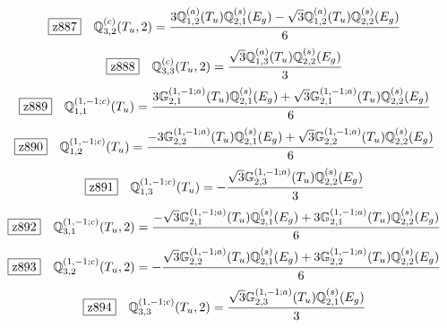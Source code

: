 \documentclass[fleqn,10pt,landscape]{jsarticle}
\begin{document}
\begin{dmath*}
\hspace*{3mm}\fbox{z887}\quad \mathbb{Q}_{3,2}^{(c)}(T_{u},2)=\frac{3 \mathbb{Q}_{1,2}^{(a)}(T_{u}) \mathbb{Q}_{2,1}^{(s)}(E_{g}) - \sqrt{3} \mathbb{Q}_{1,2}^{(a)}(T_{u}) \mathbb{Q}_{2,2}^{(s)}(E_{g})}{6}
\end{dmath*}
\begin{dmath*}
\hspace*{3mm}\fbox{z888}\quad \mathbb{Q}_{3,3}^{(c)}(T_{u},2)=\frac{\sqrt{3} \mathbb{Q}_{1,3}^{(a)}(T_{u}) \mathbb{Q}_{2,2}^{(s)}(E_{g})}{3}
\end{dmath*}
\begin{dmath*}
\hspace*{3mm}\fbox{z889}\quad \mathbb{Q}_{1,1}^{(1,-1;c)}(T_{u})=\frac{3 \mathbb{G}_{2,1}^{(1,-1;a)}(T_{u}) \mathbb{Q}_{2,1}^{(s)}(E_{g}) + \sqrt{3} \mathbb{G}_{2,1}^{(1,-1;a)}(T_{u}) \mathbb{Q}_{2,2}^{(s)}(E_{g})}{6}
\end{dmath*}
\begin{dmath*}
\hspace*{3mm}\fbox{z890}\quad \mathbb{Q}_{1,2}^{(1,-1;c)}(T_{u})=\frac{- 3 \mathbb{G}_{2,2}^{(1,-1;a)}(T_{u}) \mathbb{Q}_{2,1}^{(s)}(E_{g}) + \sqrt{3} \mathbb{G}_{2,2}^{(1,-1;a)}(T_{u}) \mathbb{Q}_{2,2}^{(s)}(E_{g})}{6}
\end{dmath*}
\begin{dmath*}
\hspace*{3mm}\fbox{z891}\quad \mathbb{Q}_{1,3}^{(1,-1;c)}(T_{u})=- \frac{\sqrt{3} \mathbb{G}_{2,3}^{(1,-1;a)}(T_{u}) \mathbb{Q}_{2,2}^{(s)}(E_{g})}{3}
\end{dmath*}
\begin{dmath*}
\hspace*{3mm}\fbox{z892}\quad \mathbb{Q}_{3,1}^{(1,-1;c)}(T_{u},2)=\frac{- \sqrt{3} \mathbb{G}_{2,1}^{(1,-1;a)}(T_{u}) \mathbb{Q}_{2,1}^{(s)}(E_{g}) + 3 \mathbb{G}_{2,1}^{(1,-1;a)}(T_{u}) \mathbb{Q}_{2,2}^{(s)}(E_{g})}{6}
\end{dmath*}
\begin{dmath*}
\hspace*{3mm}\fbox{z893}\quad \mathbb{Q}_{3,2}^{(1,-1;c)}(T_{u},2)=- \frac{\sqrt{3} \mathbb{G}_{2,2}^{(1,-1;a)}(T_{u}) \mathbb{Q}_{2,1}^{(s)}(E_{g}) + 3 \mathbb{G}_{2,2}^{(1,-1;a)}(T_{u}) \mathbb{Q}_{2,2}^{(s)}(E_{g})}{6}
\end{dmath*}
\begin{dmath*}
\hspace*{3mm}\fbox{z894}\quad \mathbb{Q}_{3,3}^{(1,-1;c)}(T_{u},2)=\frac{\sqrt{3} \mathbb{G}_{2,3}^{(1,-1;a)}(T_{u}) \mathbb{Q}_{2,1}^{(s)}(E_{g})}{3}
\end{dmath*}
\end{document}
